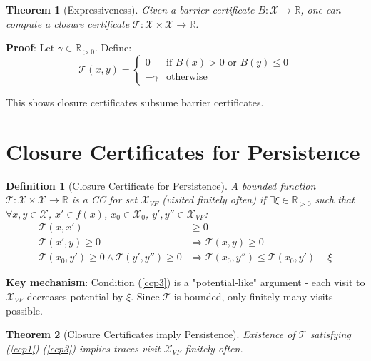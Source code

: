 \documentclass{article}
\newtheorem{definition}{Definition}
\newtheorem{theorem}{Theorem}
\begin{document}
\begin{theorem}[Expressiveness]
Given a barrier certificate $B: \mathcal{X} \rightarrow \mathbb{R}$, one can compute a closure certificate $\mathcal{T}: \mathcal{X} \times \mathcal{X} \rightarrow \mathbb{R}$.
\end{theorem}

\textbf{Proof}: Let $\gamma \in \mathbb{R}_{>0}$. Define:
\begin{equation}
\mathcal{T}(x, y) = \begin{cases}
0 & \text{if } B(x) > 0 \text{ or } B(y) \leq 0\\
-\gamma & \text{otherwise}
\end{cases}
\end{equation}

This shows closure certificates subsume barrier certificates.

\section{Closure Certificates for Persistence}

\begin{definition}[Closure Certificate for Persistence]
A bounded function $\mathcal{T}: \mathcal{X} \times \mathcal{X} \rightarrow \mathbb{R}$ is a CC for set $\mathcal{X}_{VF}$ (visited finitely often) if $\exists \xi \in \mathbb{R}_{>0}$ such that $\forall x, y \in \mathcal{X}$, $x' \in f(x)$, $x_0 \in \mathcal{X}_0$, $y', y'' \in \mathcal{X}_{VF}$:
\begin{align}
\mathcal{T}(x, x') &\geq 0 \label{ccp1}\\
\mathcal{T}(x', y) \geq 0 &\Rightarrow \mathcal{T}(x, y) \geq 0 \label{ccp2}\\
\mathcal{T}(x_0, y') \geq 0 \land \mathcal{T}(y', y'') \geq 0 &\Rightarrow \mathcal{T}(x_0, y'') \leq \mathcal{T}(x_0, y') - \xi \label{ccp3}
\end{align}
\end{definition}

\textbf{Key mechanism}: Condition (\ref{ccp3}) is a "potential-like" argument - each visit to $\mathcal{X}_{VF}$ decreases potential by $\xi$. Since $\mathcal{T}$ is bounded, only finitely many visits possible.

\begin{theorem}[Closure Certificates imply Persistence]
Existence of $\mathcal{T}$ satisfying (\ref{ccp1})-(\ref{ccp3}) implies traces visit $\mathcal{X}_{VF}$ finitely often.
\end{theorem}
\end{document}
